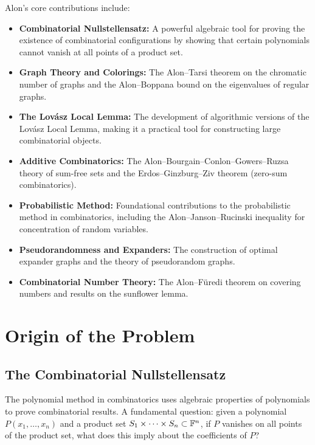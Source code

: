 Alon's core contributions include:
\begin{itemize}
    \item \textbf{Combinatorial Nullstellensatz:} A powerful algebraic tool for proving the existence of combinatorial configurations by showing that certain polynomials cannot vanish at all points of a product set.
    \item \textbf{Graph Theory and Colorings:} The Alon--Tarsi theorem on the chromatic number of graphs and the Alon--Boppana bound on the eigenvalues of regular graphs.
    \item \textbf{The Lov\'asz Local Lemma:} The development of algorithmic versions of the Lov\'asz Local Lemma, making it a practical tool for constructing large combinatorial objects.
    \item \textbf{Additive Combinatorics:} The Alon--Bourgain--Conlon--Gowers--Ruzsa theory of sum-free sets and the Erdos--Ginzburg--Ziv theorem (zero-sum combinatorics).
    \item \textbf{Probabilistic Method:} Foundational contributions to the probabilistic method in combinatorics, including the Alon--Janson--Rucinski inequality for concentration of random variables.
    \item \textbf{Pseudorandomness and Expanders:} The construction of optimal expander graphs and the theory of pseudorandom graphs.
    \item \textbf{Combinatorial Number Theory:} The Alon--F\"uredi theorem on covering numbers and results on the sunflower lemma.
\end{itemize}

\section{Origin of the Problem}

\subsection{The Combinatorial Nullstellensatz}

The polynomial method in combinatorics uses algebraic properties of polynomials to prove combinatorial results. A fundamental question: given a polynomial $P(x_1, \ldots, x_n)$ and a product set $S_1 \times \cdots \times S_n \subset \mathbb{F}^n$, if $P$ vanishes on all points of the product set, what does this imply about the coefficients of $P$?

